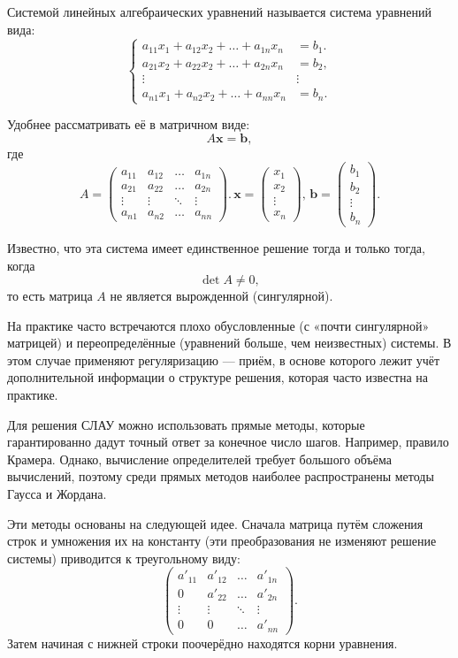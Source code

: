 Системой линейных алгебраических уравнений называется система уравнений
вида:
\[
\begin{cases}
a_{11}x_{1}+a_{12}x_{2}+\ldots+a_{1n}x_{n} & =b_{1}.\\
a_{21}x_{2}+a_{22}x_{2}+\ldots+a_{2n}x_{n} & =b_{2},\\
\vdots & \vdots\\
a_{n1}x_{1}+a_{n2}x_{2}+\ldots+a_{nn}x_{n} & =b_{n}.
\end{cases}
\]


Удобнее рассматривать её в матричном виде:
\[
A\mathbf{x}=\mathbf{b},
\]
где 
\[
A=\begin{pmatrix}a_{11} & a_{12} & \dots & a_{1n}\\
a_{21} & a_{22} & \dots & a_{2n}\\
\vdots & \vdots & \ddots & \vdots\\
a_{n1} & a_{n2} & \ldots & a_{nn}
\end{pmatrix}.\,\mathbf{x}=\begin{pmatrix}x_{1}\\
x_{2}\\
\vdots\\
x_{n}
\end{pmatrix},\,\mathbf{b}=\begin{pmatrix}b_{1}\\
b_{2}\\
\vdots\\
b_{n}
\end{pmatrix}.
\]


Известно, что эта система имеет единственное решение тогда и только
тогда, когда
\[
\det A\neq0,
\]
то есть матрица $A$ не является вырожденной (сингулярной).

На практике часто встречаются плохо обусловленные (с «почти сингулярной»
матрицей) и переопределённые (уравнений больше, чем неизвестных) системы.
В этом случае применяют регуляризацию — приём, в основе которого лежит
учёт дополнительной информации о структуре решения, которая часто
известна на практике.

Для решения СЛАУ можно использовать прямые методы, которые гарантированно
дадут точный ответ за конечное число шагов. Например, правило Крамера.
Однако, вычисление определителей требует большого объёма вычислений,
поэтому среди прямых методов наиболее распространены методы Гаусса
и Жордана.

Эти методы основаны на следующей идее. Сначала матрица путём сложения
строк и умножения их на константу (эти преобразования не изменяют
решение системы) приводится к треугольному виду:
\[
\begin{pmatrix}a'_{11} & a'_{12} & \dots & a'_{1n}\\
0 & a'_{22} & \dots & a'_{2n}\\
\vdots & \vdots & \ddots & \vdots\\
0 & 0 & \ldots & a'_{nn}
\end{pmatrix}.
\]
Затем начиная с нижней строки поочерёдно находятся корни уравнения.

